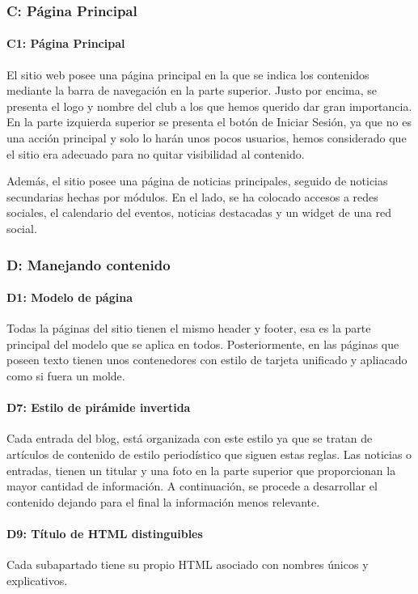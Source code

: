 \documentclass[10pt, spanish, pdftex]{template/UC3M_document}
\begin{document}
\subsubsection{C: Página Principal}
\paragraph{C1: Página Principal}
  El sitio web posee una página principal en la que se indica los contenidos mediante la barra de navegación en la parte superior. Justo por encima, se presenta el logo y nombre del club a los que hemos querido dar gran importancia. En la parte izquierda superior se presenta el botón de Iniciar Sesión, ya que no es una acción principal y solo lo harán unos pocos usuarios, hemos considerado que el sitio era adecuado para no quitar visibilidad al contenido.

  Además, el sitio posee una página de noticias principales, seguido de noticias secundarias hechas por módulos. En el lado, se ha colocado accesos a redes sociales, el calendario del eventos, noticias destacadas y un widget de una red social.


\subsubsection{D: Manejando contenido}
\paragraph{D1: Modelo de página}
  Todas la páginas del sitio tienen el mismo header y footer, esa es la parte principal del modelo que se aplica en todos. Posteriormente, en las páginas que poseen texto tienen unos contenedores con estilo de tarjeta unificado y apliacado como si fuera un molde.
\paragraph{D7: Estilo de pirámide invertida}
  Cada entrada del blog, está organizada con este estilo ya que se tratan de artículos de contenido de estilo periodístico que siguen estas reglas. Las noticias o entradas, tienen un titular y una foto en la parte superior que proporcionan la mayor cantidad de información. A continuación, se procede a desarrollar el contenido dejando para el final la información menos relevante.
\paragraph{D9: Título de HTML distinguibles}
  Cada subapartado tiene su propio HTML asociado con nombres únicos y explicativos.
\end{document}
